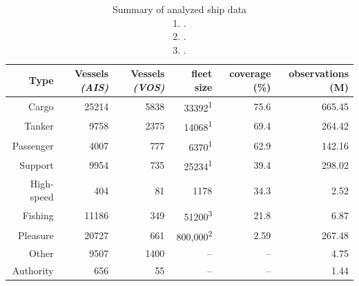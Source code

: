 

\begin{table}[htbp]
  \begin{tabular}{rrrrrr} %
    \hline
    Type & Vessels \textit{(AIS)} & Vessels \textit{(VOS)} & fleet size & coverage (\%) & observations (M) \\

    \hline
    Cargo & 25214 & 5838 & 33392\textsuperscript{1} & 75.6 & 665.45 \\
    Tanker & 9758 & 2375 & 14068\textsuperscript{1} & 69.4 & 264.42 \\
    Passenger & 4007 & 777 & 6370\textsuperscript{1} & 62.9 & 142.16 \\
    Support & 9954 & 735 & 25234\textsuperscript{1} & 39.4 & 298.02 \\
    High-speed & 404 & 81 & 1178 & 34.3 & 2.52 \\
    Fishing & 11186 & 349 & 51200\textsuperscript{3} & 21.8 & 6.87 \\
    Pleasure & 20727 & 661 & 800,000\textsuperscript{2} & 2.59 & 267.48 \\
    Other & 9507 & 1400 & -- & -- & 4.75 \\
    Authority & 656 & 55 & -- & -- & 1.44 \\
  \end{tabular}
  \caption{Summary of analyzed ship data\\
  1. \cite{Equasis2011}.\\
  2. \cite{westwood2001global}.\\
  3. \cite{FAOfishing}.}
  \label{table:ships-by-type}
\end{table}

